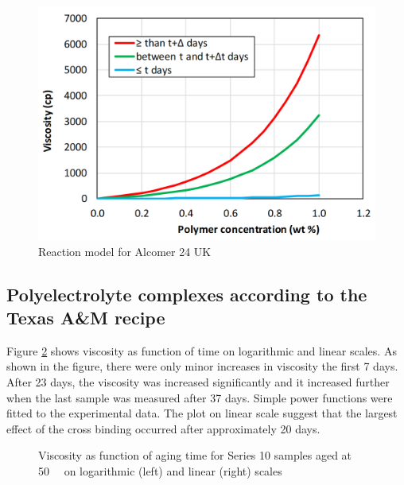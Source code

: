 \begin{figure}
    \centering
    \includegraphics[width=.75\textwidth]{img/cht/viscPolcModel.png}
    \caption{Reaction model for Alcomer 24 UK}
    \label{cht:viscPolcModel}
\end{figure}




\subsection{Polyelectrolyte complexes according to the Texas A\&M recipe}

Figure \ref{cht:s10visc50} shows viscosity as function of time on logarithmic and linear scales. As shown in the figure, there were only minor increases in viscosity the first 7 days. After 23 days, the viscosity was increased significantly and it increased further when the last sample was measured after 37 days. Simple power functions were fitted to the experimental data. The plot on linear scale suggest that the largest effect of the cross binding occurred after approximately 20 days. 

\begin{figure}
    \centering
    \caption{Viscosity as function of aging time for Series 10 samples aged at 50~\celsius~ on logarithmic (left) and linear (right) scales}
    \label{cht:s10visc50}
\end{figure}

